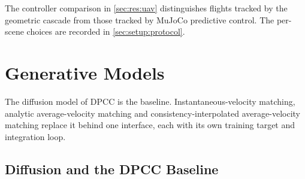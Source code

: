 \documentclass[headsepline,footsepline,footinclude=false,oneside,fontsize=11pt,paper=a4,listof=totoc,bibliography=totoc]{scrbook}
\theoremstyle{definition}
\theoremstyle{plain}
\theoremstyle{remark}
\begin{document}
The controller comparison in \autoref{sec:res:uav} distinguishes flights tracked by the geometric
cascade from those tracked by MuJoCo predictive control. The per-scene choices are recorded in
\autoref{sec:setup:protocol}.

\section{Generative Models}\label{sec:method:engine}

The diffusion model of \ac{DPCC} is the baseline. Instantaneous-velocity matching, analytic
average-velocity matching and consistency-interpolated average-velocity matching replace it
behind one interface, each with its own training target and integration loop.

\subsection{Diffusion and the DPCC Baseline}\label{sec:method:diffusion}
\end{document}
